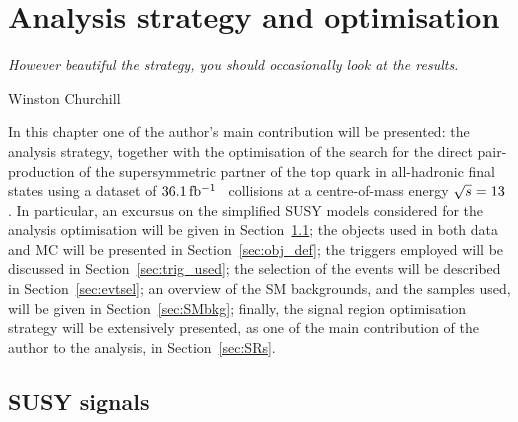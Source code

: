 \chapter{Analysis strategy and optimisation}
\label{ch:stop_ana}
\epigraph{\emph{However beautiful the strategy, you should occasionally look at the results.}}{Winston Churchill}

	In this chapter one of the author's main contribution will be presented: the analysis strategy, together with the optimisation of the search for the direct pair-production of the supersymmetric partner of the top quark in all-hadronic final states using a dataset of $36.1\, \mbox{fb$^{-1}$}$ \pp\ collisions at a centre-of-mass energy $\sqrt{s} = 13$ \TeV. In particular, an excursus on the simplified \ac{SUSY} models considered for the analysis optimisation will be given in Section~\ref{sec:susysig}; the objects used in both data and \ac{MC} will be presented in Section~\ref{sec:obj_def}; the triggers employed will be discussed in Section~\ref{sec:trig_used}; the selection of the events will be described in Section~\ref{sec:evtsel}; an overview of the \ac{SM} backgrounds, and the samples used, will be given in Section~\ref{sec:SMbkg}; finally, the signal region optimisation strategy will be extensively presented, as one of the main contribution of the author to the analysis, in Section~\ref{sec:SRs}. 




	\section{SUSY signals}
	\label{sec:susysig}

